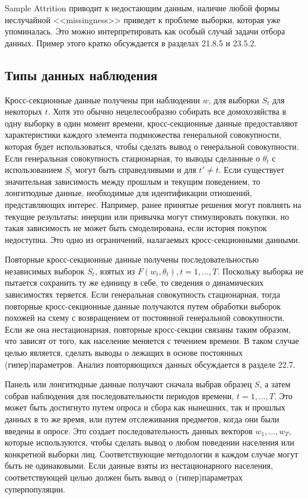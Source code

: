 Sample Attrition приводит к недостающим данным, наличие любой формы неслучайной <<missingness>> приведет к проблеме выборки, которая уже упоминалась. Это можно интерпретировать как особый случай задачи отбора данных. Пример этого кратко обсуждается в разделах 21.8.5 и 23.5.2.

\subsection{Типы данных наблюдения}

Кросс-секционные данные получены при наблюдении $w$, для выборки $S_{t}$ для некоторых $t$. Хотя это обычно нецелесообразно собирать все домохозяйства в одну выборку в один момент времени, кросс-секционные данные предоставляют характеристики каждого элемента подмножества генеральной совокупности, которая будет использоваться, чтобы сделать вывод о генеральной совокупности. Если генеральная совокупность стационарная, то выводы сделанные о $\theta_{t}$ с использованием $S_{t}$ могут быть справедливыми и для $t'\neq t$. Если существует значительная зависимость между прошлым и текущим поведением, то лонгитюдные данные, необходимые для идентификации отношений, представляющих интерес. Например, ранее принятые решения могут повлиять на текущие результаты; инерции или привычка могут стимулировать покупки, но такая зависимость не может быть смоделирована, если история покупок недоступна. Это одно из ограничений, налагаемых кросс-секционными данными.


Повторные кросс-секционные данные получены последовательностью независимых выборок $S_{t}$, взятых из $F(w_{t},\theta_{t}), t=1,\dots,T$. Поскольку выборка не пытается сохранить ту же единицу в себе, то сведения о динамических зависимостях теряется. Если генеральная совокупность стационарная, тогда повторные кросс-секционные данные получаются путем обработки выборок похожей на схему с возвращением от постоянной генеральной совокупности. Если же она нестационарная, повторные кросс-секции связаны таким образом, что зависят от того, как население меняется с течением времени. В таком случае целью является, сделать выводы о лежащих в основе постоянных (гипер)параметров. Анализ повторяющихся данных обсуждается в разделе 22.7.


Панель или лонгитюдные данные получают сначала выбрав образец $S$, а затем собрав наблюдения для последовательности периодов времени, $t=1,\dots,T$. Это может быть достигнуто путем опроса и сбора как нынешних, так и прошлых данных в то же время, или путем отслеживания предметов, когда они были введены в опросе. Это создает последовательность данных векторов ${w_{1},\dots,w_{T}}$, которые используются, чтобы сделать вывод о любом поведении населения или конкретной выборки лиц. Соответствующие методологии в каждом случае могут быть не одинаковыми. Если данные взяты из нестационарного населения, соответствующей целью должен быть вывод о (гипер)параметрах суперпопуляции.


